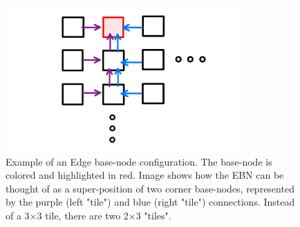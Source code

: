 \begin{figure}[]
\centering
\includegraphics[width=0.8\textwidth]{images/EBN_superposition.pdf}
\caption{Example of an Edge base-node configuration.
The base-node is colored and highlighted in red.
Image shows how the EBN can be thought of as a super-position of two corner base-nodes, represented by the purple (left "tile") and blue (right "tile") connections.
Instead of a 3$\times$3 tile, there are two 2$\times$3 "tiles".
}
\label{fig:ebn}
\end{figure}
